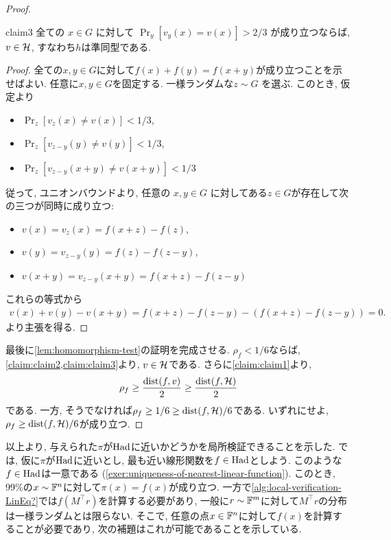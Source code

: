 \begin{proof}
    \begin{claim}{}{claim3}
      全ての $x\in G$ に対して $\Pr_y[v_y(x)=v(x)]>2/3$ が成り立つならば, $v\in \mathcal{H}$, すなわち$h$は準同型である.
    \end{claim}
    \begin{proof}
      全ての$x,y\in G$に対して$f(x)+f(y)=f(x+y)$が成り立つことを示せばよい. 任意に$x,y\in G$を固定する.
      一様ランダムな$z\sim G$ を選ぶ. このとき, 仮定より
      \begin{itemize}
        \item $\Pr_z[v_z(x)\ne v(x)]<1/3$,
        \item $\Pr_z[v_{z-y}(y)\ne v(y)]<1/3$,
        \item $\Pr_z[v_{z-y}(x+y)\ne v(x+y)]<1/3$
      \end{itemize}
      従って, ユニオンバウンドより, 任意の $x,y\in G$ に対してある$z\in G$が存在して次の三つが同時に成り立つ:
      \begin{itemize}
        \item $v(x)=v_z(x)=f(x+z)-f(z)$,
        \item $v(y)=v_{z-y}(y)=f(z)-f(z-y)$,
        \item $v(x+y)=v_{z-y}(x+y)=f(x+z)-f(z-y)$
      \end{itemize}
      これらの等式から
      \begin{align*}
        v(x)+v(y)-v(x+y) = f(x+z)-f(z-y) - (f(x+z)-f(z-y)) = 0.
      \end{align*}
      より主張を得る.
    \end{proof}
    最後に\cref{lem:homomorphism-test}の証明を完成させる.
    $\rho_f<1/6$ならば, \cref{claim:claim2,claim:claim3}より, $v\in\mathcal{H}$である.
    さらに\cref{claim:claim1}より,
    \begin{align*}
      \rho_f \ge \frac{\mathrm{dist}(f,v)}{2} \ge \frac{\mathrm{dist}(f,\mathcal{H})}{2}
    \end{align*}
    である. 一方, そうでなければ$\rho_f\ge 1/6 \ge \mathrm{dist}(f,\mathcal{H})/6$である.
    いずれにせよ, $\rho_f\ge \mathrm{dist}(f,\mathcal{H})/6$が成り立つ.
  \end{proof}
  
  以上より, 与えられた$\pi$が$\mathrm{Had}$に近いかどうかを局所検証できることを示した.
  では, 仮に$\pi$が$\mathrm{Had}$に近いとし,
  最も近い線形関数を$f\in\mathrm{Had}$としよう.
  このような$f\in\mathrm{Had}$は一意である (\cref{exer:uniqueness-of-nearest-linear-function}).
  このとき, 99\%の$x\sim\mathbb{F}^n$に対して$\pi(x)=f(x)$が成り立つ.
  一方で\cref{alg:local-verification-LinEq?}では$f(M^\top r)$を計算する必要があり,
  一般に$r\sim\mathbb{F}^m$に対して$M^\top r$の分布は一様ランダムとは限らない.
  そこで, 任意の点$x\in\mathbb{F}^n$に対して$f(x)$を計算することが必要であり,
  次の補題はこれが可能であることを示している.

